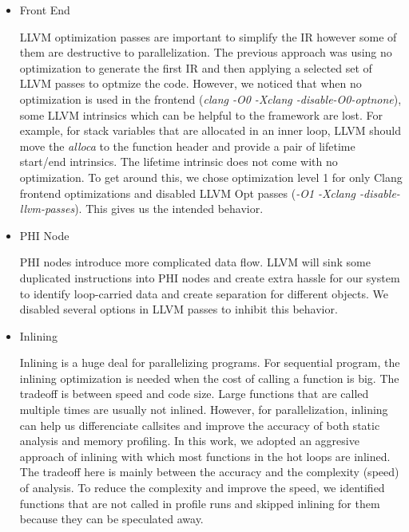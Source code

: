 \begin{itemize}
\item Front End

LLVM optimization passes are important to simplify the IR however some of
them are destructive to parallelization. The previous approach was using no
optimization to generate the first IR and then applying a selected set of
LLVM passes to optmize the code. However, we noticed that when no
optimization is used in the frontend (\textit{clang -O0 -Xclang
-disable-O0-optnone}), some LLVM intrinsics which can be helpful to the
framework are lost. For example, for stack variables that are allocated in
an inner loop, LLVM should move the \textit{alloca} to the function header
and provide a pair of lifetime start/end intrinsics. The lifetime intrinsic
does not come with no optimization. To get around this, we chose
optimization level 1 for only Clang frontend optimizations and disabled LLVM
Opt passes (\textit{-O1 -Xclang -disable-llvm-passes}). This gives us the
intended behavior.


\item PHI Node

PHI nodes introduce more complicated data flow. LLVM will sink some
duplicated instructions into PHI nodes and create extra hassle for our
system to identify loop-carried data and create separation for different
objects. We disabled several options in LLVM passes to inhibit this
behavior.

\item Inlining

Inlining is a huge deal for parallelizing programs. For sequential program,
the inlining optimization is needed when the cost of calling a function is
big. The tradeoff is between speed and code size. Large functions that are
called multiple times are usually not inlined. However, for parallelization,
inlining can help us differenciate callsites and improve the accuracy of
both static analysis and memory profiling. In this work, we adopted an
aggresive approach of inlining with which most functions in the hot loops
are inlined. The tradeoff here is mainly between the accuracy and the
complexity (speed) of analysis. To reduce the complexity and improve the
speed, we identified functions that are not called in profile runs and
skipped inlining for them because they can be speculated away.

\end{itemize}




